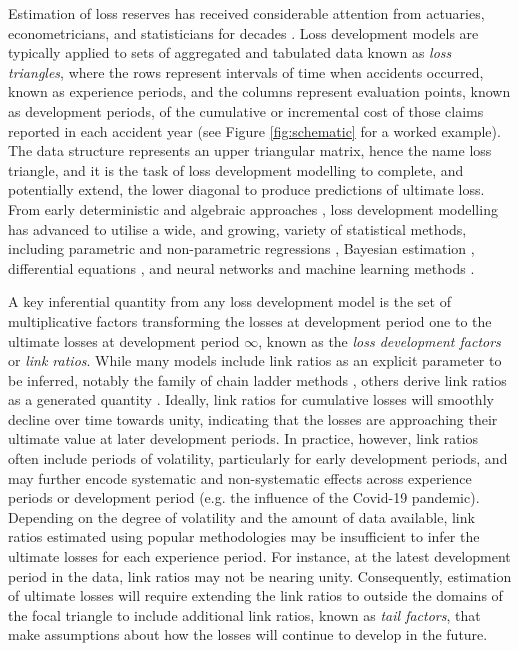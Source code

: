 Estimation of loss reserves 
has received considerable attention from actuaries, econometricians,
and statisticians for decades 
\citep[e.g. for some key developments, see][]{bornhuetter1972,clarke1974,
taylor1977,taylor1983,mack1993,barnett2000,englandverrall2001,englandverrall2002,
taylor2003,wuthrich2008}. 
Loss development models are typically applied to sets of aggregated and tabulated
data known as \textit{loss triangles}, where the rows represent
intervals of time when accidents occurred, known as experience periods,
and the columns represent evaluation points, known as development periods,
of the cumulative or incremental cost of those claims reported in each accident year
(see Figure \ref{fig:schematic} for a worked example).
The data structure represents an upper triangular matrix, hence
the name loss triangle, and it is the task of loss development modelling 
to complete, and potentially extend, the
lower diagonal to produce predictions of ultimate loss.
From early deterministic and 
algebraic approaches \citep[e.g.][]{scurfield1968,
bornhuetter1972,clarke1974,taylor1977}, loss development modelling has
advanced to utilise a wide, and growing, variety of statistical methods, 
including parametric and non-parametric regressions \citep{mack1994,englandverrall2001,
englandverrall2002,lally2018}, Bayesian estimation \citep{englandverrall2002,dealba2002,
zhang2012,meyers2015}, differential equations \citep{gesmann2020}, and 
neural networks and machine learning methods 
\citep{kunce2017,kuo2019,almudafer2022}.

A key inferential quantity from any loss development
model is the set of multiplicative factors transforming 
the losses at development period one to
the ultimate losses at development period $\infty$,
known as the \textit{loss development factors} or \textit{link ratios}. 
While many models include link ratios as an explicit parameter to be 
inferred, notably the family of chain ladder methods
\citep[e.g.][]{mack1993,englandverrall2002},
others derive link ratios as a generated quantity \citep{englandverrall2001,meyers2015}. 
Ideally, link ratios for cumulative losses will smoothly decline over time towards unity,
indicating that the losses are approaching their ultimate value at later development
periods.
In practice, however, link ratios often include periods of volatility, particularly
for early development periods, and may further encode systematic
and non-systematic effects across experience periods or 
development period (e.g. the influence of the Covid-19 pandemic).
Depending on the degree of volatility and the amount of data available,
link ratios estimated using popular methodologies
may be insufficient to infer the ultimate losses for each experience period.
For instance, at the latest development period in the data, link ratios
may not be nearing unity.
Consequently, estimation of ultimate losses will require extending the link ratios
to outside the domains of the focal triangle to include additional
link ratios, known as \textit{tail factors}, that make assumptions
about how the losses will continue to develop in the future.

